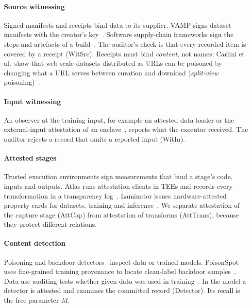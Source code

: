 \paragraph{Source witnessing}
Signed manifests and receipts bind data to its supplier. VAMP signs dataset manifests with
the creator's key~\cite{stokes2021prevent}. Software supply-chain frameworks sign the steps
and artefacts of a build~\cite{torresarias2019intoto,newman2022sigstore}. The auditor's
check is that every recorded item is covered by a receipt (\textsf{WitSrc}). Receipts must
bind \emph{content}, not names: Carlini et al.\ show that web-scale datasets distributed
as URLs can be poisoned by changing what a URL serves between curation and
download (\emph{split-view} poisoning)~\cite{carlini2024poisoning}.

\paragraph{Input witnessing}
An observer at the training input, for example an attested data loader or the
external-input attestation of an enclave~\cite{huang2026exia}, reports what the executor
received. The auditor rejects a record that omits a reported input (\textsf{WitIn}).

\paragraph{Attested stages}
Trusted execution environments sign measurements that bind a stage's code, inputs and
outputs. Atlas runs attestation clients in TEEs and records every transformation in a
transparency log~\cite{spoczynski2025atlas}. Laminator issues hardware-attested property
cards for datasets, training and inference~\cite{duddu2025laminator}. We separate
attestation of the capture stage (\textsf{AttCap}) from attestation of transforms
(\textsf{AttTrans}), because they protect different relations.

\paragraph{Content detection}
Poisoning and backdoor detectors~\cite{goldblum2023dataset,tran2018spectral} inspect data
or trained models. PoisonSpot uses fine-grained training provenance to locate clean-label
backdoor samples~\cite{hailemariam2025poisonspot}. Data-use auditing tests whether given
data was used in training~\cite{huang2024datause,chen2025anonymity}. In the model a
detector is attested and examines the committed record (\textsf{Detector}). Its recall is
the free parameter $M$.

